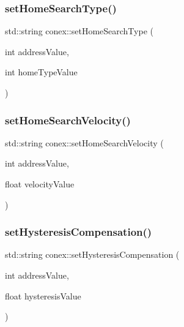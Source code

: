 \mbox{\label{namespaceconex_a2b7cd3e7462a4a8f2ba9e48ea5b5c450}} 
\subsubsection{\texorpdfstring{set\+Home\+Search\+Type()}{setHomeSearchType()}}
{\footnotesize\ttfamily std\+::string conex\+::set\+Home\+Search\+Type (\begin{DoxyParamCaption}\item[{int}]{address\+Value,  }\item[{int}]{home\+Type\+Value }\end{DoxyParamCaption})}

\mbox{\label{namespaceconex_ae0d284374b70f666fa8cad9bb3c81aa4}} 
\subsubsection{\texorpdfstring{set\+Home\+Search\+Velocity()}{setHomeSearchVelocity()}}
{\footnotesize\ttfamily std\+::string conex\+::set\+Home\+Search\+Velocity (\begin{DoxyParamCaption}\item[{int}]{address\+Value,  }\item[{float}]{velocity\+Value }\end{DoxyParamCaption})}

\mbox{\label{namespaceconex_a3a057c09b112f734431cb331669bc46b}} 
\subsubsection{\texorpdfstring{set\+Hysteresis\+Compensation()}{setHysteresisCompensation()}}
{\footnotesize\ttfamily std\+::string conex\+::set\+Hysteresis\+Compensation (\begin{DoxyParamCaption}\item[{int}]{address\+Value,  }\item[{float}]{hysteresis\+Value }\end{DoxyParamCaption})}

